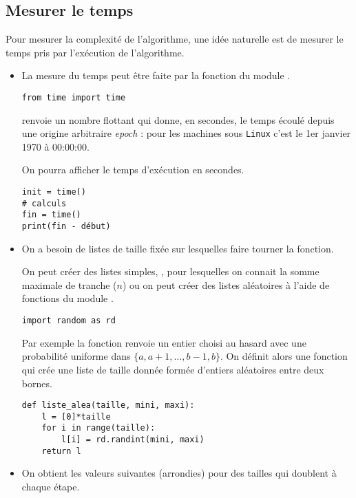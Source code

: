 \subsection{Mesurer le temps}
Pour mesurer la complexité de l'algorithme, une idée naturelle est de mesurer le temps pris par l'exécution de l'algorithme. 
\begin{itemize}
    \item La mesure du temps peut être faite par la fonction  du module .
\begin{lstlisting}
from time import time
\end{lstlisting}
 renvoie un nombre flottant qui donne, en secondes, le temps écoulé depuis une origine arbitraire {\it epoch} : pour les machines sous {\tt Linux} c'est le 1er janvier 1970 à 00:00:00.

On pourra afficher le temps d'exécution en secondes.
\begin{lstlisting}
init = time()
# calculs
fin = time()
print(fin - début)
\end{lstlisting}

\item On a besoin de listes de taille fixée sur lesquelles faire tourner la fonction.

On peut créer des listes simples, , pour lesquelles on connait la somme maximale de tranche ($n$) ou on peut créer des listes aléatoires à l'aide de fonctions du module .
\begin{lstlisting}
import random as rd
\end{lstlisting}
Par exemple la fonction  renvoie un entier choisi au hasard avec une probabilité uniforme dans $\{a, a+1, \ldots, b-1, b\}$.
On définit alors une fonction qui crée une liste de taille donnée formée d'entiers aléatoires entre deux bornes.

\newpage
\begin{lstlisting}
def liste_alea(taille, mini, maxi):
    l = [0]*taille
    for i in range(taille):
        l[i] = rd.randint(mini, maxi)
    return l
\end{lstlisting}
\item On obtient les valeurs suivantes (arrondies) pour des tailles qui doublent à chaque étape.


\end{itemize}
